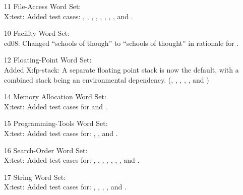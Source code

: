 \begin{itemize}
	\item[11] File-Access Word Set: \\
		\textsf{X:test}: Added test cases:
		,
		, \linebreak
		,
		,
		, \linebreak
		,
		,
		,
		 and
		.

	\item[10] Facility Word Set: \\
		\textsf{ed08}: Changed ``schools of though'' to ``schools of
			thought'' in rationale for \linebreak
			.

	\item[12] Floating-Point Word Set: \\
		Added \textsf{X:fp-stack}:
		A separate floating point stack is now the default,
		with a combined stack being an environmental
		dependency.
		(,
		 ,
		 ,
		 ,
		 , and
		 )

	\item[14] Memory Allocation Word Set: \\
		\textsf{X:test}: Added test cases for
		 and .

	\item[15] Programming-Tools Word Set: \\
		\textsf{X:test}: Added test cases for:
			,
			, \linebreak
			 and
			.

	\item[16] Search-Order Word Set: \\
		\textsf{X:test}: Added test cases for:
		,
		,
		,
		,
		, \linebreak
		,
		,
		 and \linebreak
		.

	\item[17] String Word Set: \\
		\textsf{X:test}: Added test cases for:
		,
		,
		,
		,
		 and
		.


\end{itemize}
